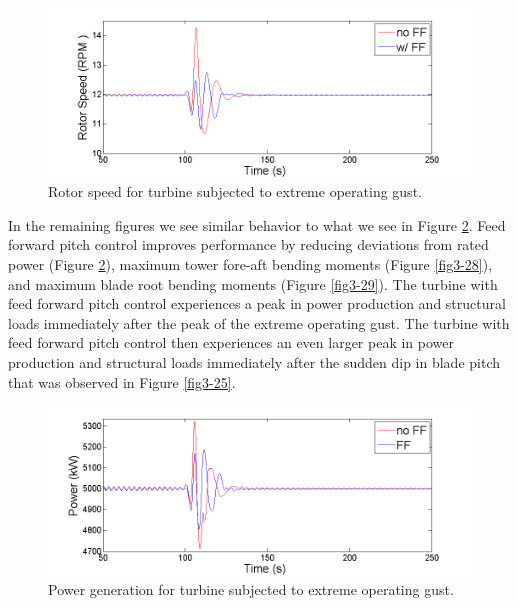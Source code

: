 \begin{figure}[htbp]
	\centering
		\includegraphics[width = \linewidth]{Figures/ch3Figures/fig3-26.png}
		
	\caption{Rotor speed for turbine subjected to extreme operating gust. }
	\label{fig3-26}
\end{figure}

In the remaining figures we see similar behavior to what we see in Figure \ref{fig3-27}. Feed forward pitch control improves performance by reducing deviations from rated power (Figure \ref{fig3-27}), maximum tower fore-aft bending moments (Figure \ref{fig3-28}), and maximum blade root bending moments (Figure \ref{fig3-29}). The turbine with feed forward pitch control experiences a peak in power production and structural loads immediately after the peak of the extreme operating gust. The turbine with feed forward pitch control then experiences an even larger peak in power production and structural loads immediately after the sudden dip in blade pitch that was observed in Figure \ref{fig3-25}.

\begin{figure}[htbp]
	\centering
		\includegraphics[width = \linewidth]{Figures/ch3Figures/fig3-27.png}
		
	\caption{Power generation for turbine subjected to extreme operating gust.}
	\label{fig3-27}
\end{figure}

